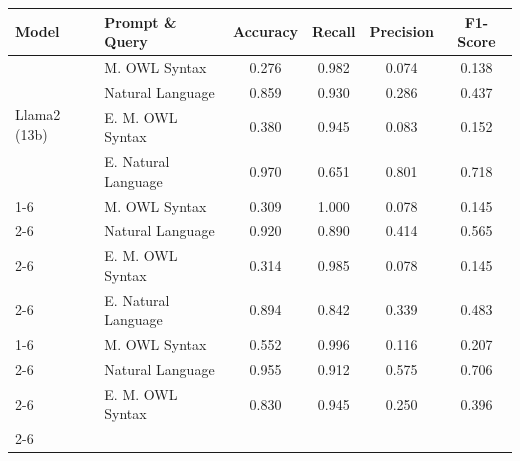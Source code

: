 \begin{table}[ht]
    \centering
    \label{tab:results-animals}
    \tiny
    \setlength{\tabcolsep}{4pt}
    \begin{tabular}{|l|l|c|c|c|c|}
        \hline
        \textbf{Model} & \textbf{Prompt \& Query} & \textbf{Accuracy} & \textbf{Recall} & \textbf{Precision} & \textbf{F1-Score} \\
        \hline
        \multirow{4}{*}{Llama2 (13b)}
         & \cellcolor[HTML]{EFEFEF} M. OWL Syntax     & \cellcolor[HTML]{EFEFEF} 0.276 & \cellcolor[HTML]{EFEFEF} 0.982 & \cellcolor[HTML]{EFEFEF} 0.074 & \cellcolor[HTML]{EFEFEF} 0.138 \\ \cline{2-6}
         & Natural Language                             & 0.859 & 0.930 & 0.286 & 0.437 \\ \cline{2-6}
         & \cellcolor[HTML]{EFEFEF} E. M. OWL Syntax   & \cellcolor[HTML]{EFEFEF} 0.380 & \cellcolor[HTML]{EFEFEF} 0.945 & \cellcolor[HTML]{EFEFEF} 0.083 & \cellcolor[HTML]{EFEFEF} 0.152 \\ \cline{2-6}
         & E. Natural Language                           & 0.970 & 0.651 & 0.801 & 0.718 \\ \cline{1-6}
        \hline
        \multirow{4}{*}{Llama3 (8b)}
         & \cellcolor[HTML]{EFEFEF} M. OWL Syntax     & \cellcolor[HTML]{EFEFEF} 0.309 & \cellcolor[HTML]{EFEFEF} 1.000 & \cellcolor[HTML]{EFEFEF} 0.078 & \cellcolor[HTML]{EFEFEF} 0.145 \\ \cline{2-6}
         & Natural Language                             & 0.920 & 0.890 & 0.414 & 0.565 \\ \cline{2-6}
         & \cellcolor[HTML]{EFEFEF} E. M. OWL Syntax   & \cellcolor[HTML]{EFEFEF} 0.314 & \cellcolor[HTML]{EFEFEF} 0.985 & \cellcolor[HTML]{EFEFEF} 0.078 & \cellcolor[HTML]{EFEFEF} 0.145 \\ \cline{2-6}
         & E. Natural Language                           & 0.894 & 0.842 & 0.339 & 0.483 \\ \cline{1-6}
        \hline
        \multirow{4}{*}{Mistral (7b)}
         & \cellcolor[HTML]{EFEFEF} M. OWL Syntax     & \cellcolor[HTML]{EFEFEF} 0.552 & \cellcolor[HTML]{EFEFEF} 0.996 & \cellcolor[HTML]{EFEFEF} 0.116 & \cellcolor[HTML]{EFEFEF} 0.207 \\ \cline{2-6}
         & Natural Language                             & 0.955 & 0.912 & 0.575 & 0.706 \\ \cline{2-6}
         & \cellcolor[HTML]{EFEFEF} E. M. OWL Syntax   & \cellcolor[HTML]{EFEFEF} 0.830 & \cellcolor[HTML]{EFEFEF} 0.945 & \cellcolor[HTML]{EFEFEF} 0.250 & \cellcolor[HTML]{EFEFEF} 0.396 \\ \cline{2-6}

\end{tabular}
\end{table}
